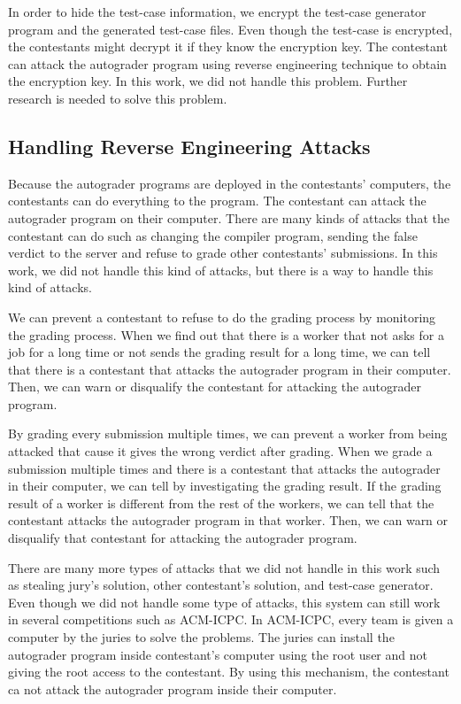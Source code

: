 \documentclass[conference,a4paper]{IEEEtran}
\begin{document}
In order to hide the test-case information, we encrypt the test-case generator program and the generated test-case files. Even though the test-case is encrypted, the contestants might decrypt it if they know the encryption key. The contestant can attack the autograder program using reverse engineering technique to obtain the encryption key. In this work, we did not handle this problem. Further research is needed to solve this problem.

\subsection{Handling Reverse Engineering Attacks}

Because the autograder programs are deployed in the contestants' computers, the contestants can do everything to the program. The contestant can attack the autograder program on their computer. There are many kinds of attacks that the contestant can do such as changing the compiler program, sending the false verdict to the server and refuse to grade other contestants' submissions. In this work, we did not handle this kind of attacks, but there is a way to handle this kind of attacks.

We can prevent a contestant to refuse to do the grading process by monitoring the grading process. When we find out that there is a worker that not asks for a job for a long time or not sends the grading result for a long time, we can tell that there is a contestant that attacks the autograder program in their computer. Then, we can warn or disqualify the contestant for attacking the autograder program.

By grading every submission multiple times, we can prevent a worker from being attacked that cause it gives the wrong verdict after grading. When we grade a submission multiple times and there is a contestant that attacks the autograder in their computer, we can tell by investigating the grading result. If the grading result of a worker is different from the rest of the workers, we can tell that the contestant attacks the autograder program in that worker. Then, we can warn or disqualify that contestant for attacking the autograder program.

There are many more types of attacks that we did not handle in this work such as stealing jury's solution, other contestant's solution, and test-case generator. Even though we did not handle some type of attacks, this system can still work in several competitions such as ACM-ICPC. In ACM-ICPC, every team is given a computer by the juries to solve the problems. The juries can install the autograder program inside contestant's computer using the root user and not giving the root access to the contestant. By using this mechanism, the contestant ca not attack the autograder program inside their computer.
\end{document}
